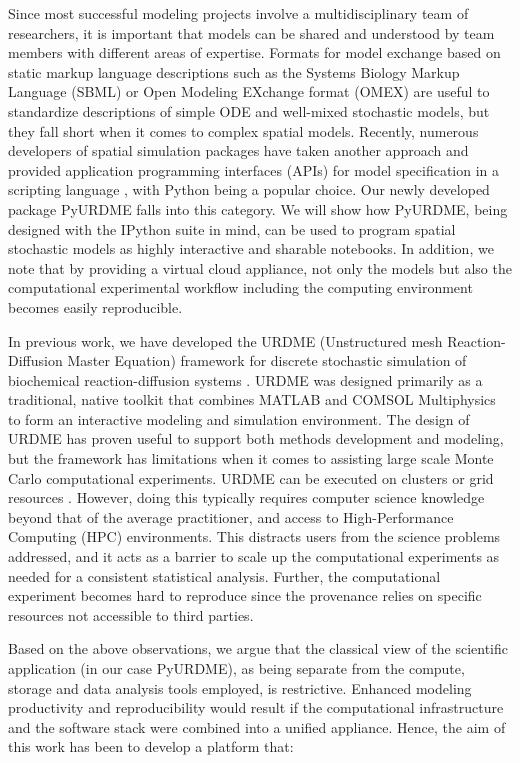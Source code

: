 \documentclass[final,leqno,onefignum,onetabnum]{siamltex1213}
\begin{document}
Since most successful modeling projects involve a multidisciplinary team of researchers, it is important that models can be shared and understood by team members with different areas of expertise. Formats for model exchange based on static markup language descriptions such as the Systems Biology Markup Language (SBML) \cite{SBML} or Open Modeling EXchange format (OMEX) \cite{Bergmann2014} are useful to standardize descriptions of simple ODE and well-mixed stochastic models, but they fall short when it comes to complex spatial models. Recently, numerous developers of spatial simulation packages have taken another approach and provided application programming interfaces (APIs) for model specification in a scripting language \cite{pysb, steps, eGFRD}, with Python being a popular choice.  Our newly developed package PyURDME falls into this category.  We will show how PyURDME, being designed with the IPython suite in mind, can be used to program spatial stochastic models as highly interactive and sharable notebooks. 
In addition, we note that by providing a virtual cloud appliance, not only the models but also the computational experimental workflow including the computing environment becomes easily reproducible. 

In previous work, we have developed the URDME (Unstructured mesh Reaction-Diffusion Master Equation) framework for discrete stochastic simulation of biochemical reaction-diffusion systems \cite{urdme}. URDME was designed primarily as a traditional, native toolkit that combines MATLAB and COMSOL Multiphysics to form an interactive modeling and simulation environment. The  design of URDME has proven useful to support both methods development and modeling, but the framework has limitations when it comes to assisting large scale Monte Carlo computational experiments. URDME can be executed on clusters or grid resources \cite{urdme_bioinformatics2012}.
However, doing this typically requires computer science knowledge beyond that of the average practitioner, and access to High-Performance Computing (HPC) environments. 
This distracts users from the science problems addressed, and it acts as a barrier to scale up the computational experiments as needed for a consistent statistical analysis.  
Further, the computational experiment becomes hard to reproduce since the provenance relies on specific resources not accessible to third parties.  

Based on the above observations, we argue that the classical view of the scientific application (in our case PyURDME), as being separate from the compute, storage and data analysis tools employed, is restrictive. Enhanced modeling productivity and reproducibility would result if the computational infrastructure and the software stack were combined into a unified appliance. 
Hence, the aim of this work has been to develop a platform that: 
\end{document}
